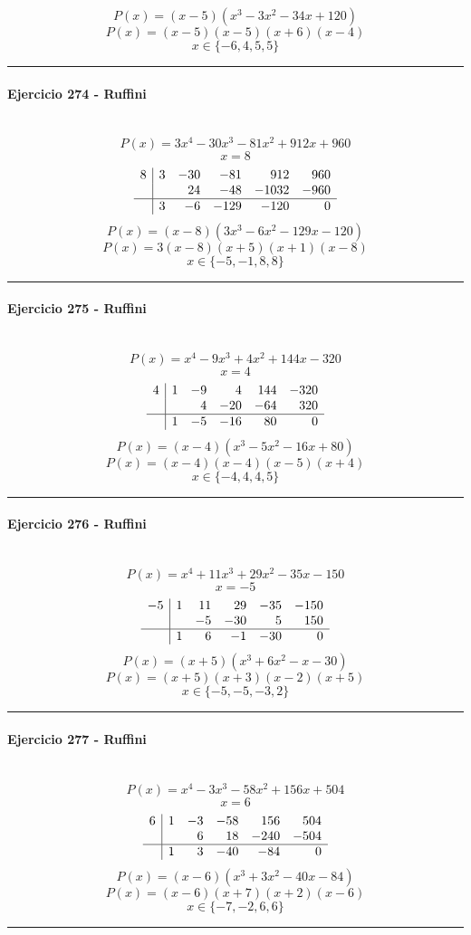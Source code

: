 \documentclass[10pt,a4paper]{article}
\newcommand{\res}[1]{\paragraph{#1}\mbox{}\\[-1.2em]}
\begin{document}
\[ P(x)=(x-5)(x^{3} - 3 x^{2} - 34 x + 120) \]
\[ P(x)=(x-5)(x-5)(x+6)(x-4) \]
\[ \boxed{x\in\{-6,4,5,5\}} \]
\vspace{1mm}\hrule\vspace{2mm}
\res{Ejercicio 274 - Ruffini}
\[ P(x)=3 x^{4} - 30 x^{3} - 81 x^{2} + 912 x + 960 \]
\[ x=8 \]
\[\begin{array}{r|rrrrr}8 & 3 & -30 & -81 & 912 & 960\\  &  & 24 & -48 & -1032 & -960\\\hline  & 3 & -6 & -129 & -120 & 0\end{array}\]
\[ P(x)=(x-8)(3 x^{3} - 6 x^{2} - 129 x - 120) \]
\[ P(x)=3(x-8)(x+5)(x+1)(x-8) \]
\[ \boxed{x\in\{-5,-1,8,8\}} \]
\vspace{1mm}\hrule\vspace{2mm}
\res{Ejercicio 275 - Ruffini}
\[ P(x)=x^{4} - 9 x^{3} + 4 x^{2} + 144 x - 320 \]
\[ x=4 \]
\[\begin{array}{r|rrrrr}4 & 1 & -9 & 4 & 144 & -320\\  &  & 4 & -20 & -64 & 320\\\hline  & 1 & -5 & -16 & 80 & 0\end{array}\]
\[ P(x)=(x-4)(x^{3} - 5 x^{2} - 16 x + 80) \]
\[ P(x)=(x-4)(x-4)(x-5)(x+4) \]
\[ \boxed{x\in\{-4,4,4,5\}} \]
\vspace{1mm}\hrule\vspace{2mm}
\res{Ejercicio 276 - Ruffini}
\[ P(x)=x^{4} + 11 x^{3} + 29 x^{2} - 35 x - 150 \]
\[ x=-5 \]
\[\begin{array}{r|rrrrr}-5 & 1 & 11 & 29 & -35 & -150\\  &  & -5 & -30 & 5 & 150\\\hline  & 1 & 6 & -1 & -30 & 0\end{array}\]
\[ P(x)=(x+5)(x^{3} + 6 x^{2} - x - 30) \]
\[ P(x)=(x+5)(x+3)(x-2)(x+5) \]
\[ \boxed{x\in\{-5,-5,-3,2\}} \]
\vspace{1mm}\hrule\vspace{2mm}
\res{Ejercicio 277 - Ruffini}
\[ P(x)=x^{4} - 3 x^{3} - 58 x^{2} + 156 x + 504 \]
\[ x=6 \]
\[\begin{array}{r|rrrrr}6 & 1 & -3 & -58 & 156 & 504\\  &  & 6 & 18 & -240 & -504\\\hline  & 1 & 3 & -40 & -84 & 0\end{array}\]
\[ P(x)=(x-6)(x^{3} + 3 x^{2} - 40 x - 84) \]
\[ P(x)=(x-6)(x+7)(x+2)(x-6) \]
\[ \boxed{x\in\{-7,-2,6,6\}} \]
\vspace{1mm}\hrule\vspace{2mm}
\end{document}
